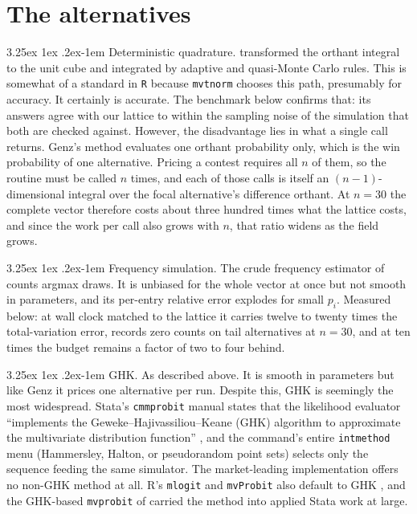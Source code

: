\documentclass[11pt]{article}
\makeatletter
\renewcommand\paragraph{\@startsection{paragraph}{4}{\z@}%
  {3.25ex \@plus1ex \@minus.2ex}{-1em}%
  {\normalfont\normalsize\itshape}}
\makeatother
\begin{document}
\section{The alternatives}\label{sec:alternatives}

\paragraph{Deterministic quadrature.} \citet{genz1992} transformed the orthant
integral to the unit cube and integrated by adaptive and quasi-Monte Carlo rules.
This is somewhat of a standard in \texttt{R} because \texttt{mvtnorm} chooses this path, presumably for accuracy. It certainly is accurate. The benchmark below confirms that: its answers agree with our lattice to within the sampling noise of the simulation that both are checked against. However, the disadvantage lies in what a single call returns. Genz's method evaluates one orthant probability only, which is the win probability of one alternative. Pricing a contest
requires all $n$ of them, so the routine must be called $n$ times, and each of
those calls is itself an $(n-1)$-dimensional integral over the focal
alternative's difference orthant. At $n=30$ the complete vector therefore
costs about three hundred times what the lattice costs, and since the work per
call also grows with $n$, that ratio widens as the field grows.

\paragraph{Frequency simulation.} The crude frequency estimator of
\citet{lerman1981} counts argmax draws. It is unbiased for the whole vector at
once but not smooth in parameters, and its per-entry relative error explodes for
small $p_i$. Measured below: at wall clock matched to the lattice it carries
twelve to twenty times the total-variation error, records zero counts on tail
alternatives at $n=30$, and at ten times the budget remains a factor of two to
four behind.

\paragraph{GHK.} As described above. It is smooth in parameters but like Genz it prices one alternative per run. Despite this, GHK is seemingly the most widespread. Stata's \texttt{cmmprobit} manual states that the likelihood evaluator ``implements the Geweke--Hajivassiliou--Keane (GHK) algorithm to approximate the multivariate distribution function''
\citep{statacorp2023,gates2006}, and the command's entire
\texttt{intmethod} menu (Hammersley, Halton, or pseudorandom point
sets) selects only the sequence feeding the same simulator. The
market-leading implementation offers no non-GHK method at all. R's
\texttt{mlogit} and \texttt{mvProbit} also default to GHK
\citep{croissant2020}, and the GHK-based \texttt{mvprobit} of
\citet{cappellari2003} carried the method into applied Stata work at
large.
\end{document}
